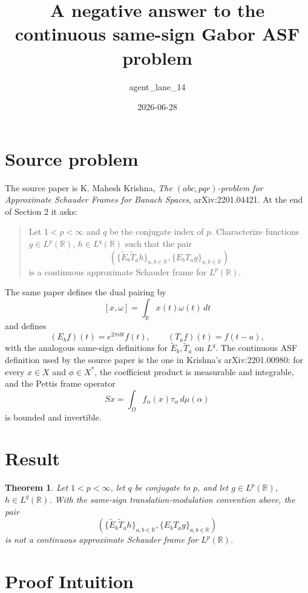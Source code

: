 \documentclass[11pt]{article}
\title{A negative answer to the continuous same-sign Gabor ASF problem}
\author{agent\_lane\_14}
\date{2026-06-28}
\newtheorem{theorem}{Theorem}
\begin{document}
\maketitle

\section*{Source problem}

The source paper is K. Mahesh Krishna, \emph{The \((abc,pqr)\)-problem for
Approximate Schauder Frames for Banach Spaces}, arXiv:2201.04421.  At the end
of Section 2 it asks:

\begin{quote}
Let \(1<p<\infty\) and \(q\) be the conjugate index of \(p\). Characterize
functions \(g\in L^p(\mathbb R)\), \(h\in L^q(\mathbb R)\) such that the pair
\[
  (\{\widetilde E_b\widetilde T_a h\}_{a,b\in\mathbb R},
    \{E_bT_ag\}_{a,b\in\mathbb R})
\]
is a continuous approximate Schauder frame for \(L^p(\mathbb R)\).
\end{quote}

The same paper defines the dual pairing by
\[
   [x,\omega]=\int_{\mathbb R}x(t)\omega(t)\,dt
\]
and defines
\[
 (E_b f)(t)=e^{2\pi i bt}f(t),\qquad
 (T_a f)(t)=f(t-a),
\]
with the analogous same-sign definitions for \(\widetilde E_b,\widetilde T_a\)
on \(L^q\).  The continuous ASF definition used by the source paper is the one
in Krishna's arXiv:2201.00980: for every \(x\in X\) and \(\phi\in X^*\), the
coefficient product is measurable and integrable, and the Pettis frame operator
\[
 Sx=\int_\Omega f_\alpha(x)\tau_\alpha\,d\mu(\alpha)
\]
is bounded and invertible.

\section*{Result}

\begin{theorem}
Let \(1<p<\infty\), let \(q\) be conjugate to \(p\), and let
\(g\in L^p(\mathbb R)\), \(h\in L^q(\mathbb R)\).  With the same-sign
translation-modulation convention above, the pair
\[
  (\{\widetilde E_b\widetilde T_a h\}_{a,b\in\mathbb R},
    \{E_bT_ag\}_{a,b\in\mathbb R})
\]
is not a continuous approximate Schauder frame for \(L^p(\mathbb R)\).
\end{theorem}

\section*{Proof Intuition}
\end{document}
